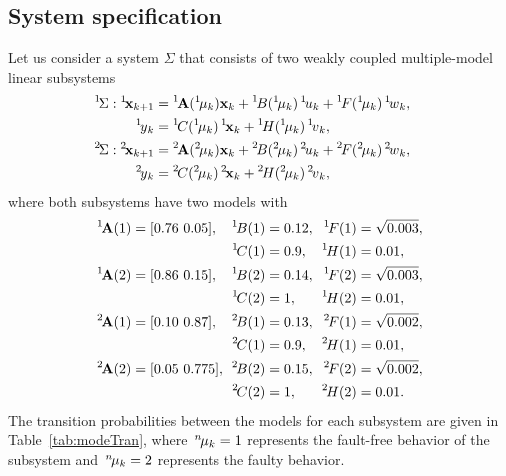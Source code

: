 \documentclass[conference,10pt]{IEEEtran}
\def\ist{\prescript{1\!}{}}
\def\iind{\prescript{2\!}{}}
\def\nth{\prescript{n\!}{}}
\begin{document}
\subsection{System specification}
\label{sec:ExampleSystemSpecification}
Let us consider a system $\Sigma$ that consists of two weakly
coupled multiple-model linear subsystems
\begin{subequations}
\begin{align*}
  \hspace{-1em}
  \ist{\Sigma}: \ist{\bfx}_{k+1} &= \ist{\bfA}(\ist{\mu}_{k}) \bfx_{k} +
  \ist{B}(\ist{\mu}_{k})\ist{u}_{k} +
  \ist{F}(\ist{\mu}_{k})\ist{w}_{k},\\
  \ist{y}_k&=\ist{C}(\ist{\mu}_{k})\ist{\bfx}_{k}+\ist{H}(\ist{\mu}_{k})\ist{v}_k,\\
  \hspace{-1em}
  \iind{\Sigma}: \iind{\bfx}_{k+1} &=  \iind{\bfA}(\iind{\mu}_{k}) \bfx_{k} +
  \iind{B}(\iind{\mu}_{k})\iind{u}_{k} +
  \iind{F}(\iind{\mu}_{k})\iind{w}_{k},\\
  \iind{y}_k&=\iind{C}(\iind{\mu}_{k})\iind{\bfx}_{k}+\iind{H}(\iind{\mu}_{k})\iind{v}_k,
\end{align*}
\end{subequations}
where both subsystems have two models with%
\begin{align*}
  \ist{\bfA}(1) & = [0.76\ 0.05], & \!\!\! \ist{B}(1) & = 0.12, & \!\! \ist{F}(1) & = \sqrt{0.003},\\
                &&\!\!\!\ist{C}(1) & = 0.9,  &\!\! \ist{H}(1) & = 0.01,\\
  \ist{\bfA}(2) & = [0.86\ 0.15], & \!\!\! \ist{B}(2) & = 0.14, & \!\! \ist{F}(2) & = \sqrt{0.003},\\
                &&\!\! \ist{C}(2) & = 1,    &\!\! \ist{H}(2) & = 0.01,\\
  \iind{\bfA}(1) & = [0.10\ 0.87], &\! \!\! \iind{B}(1) & = 0.13, & \!\! \iind{F}(1) & = \sqrt{0.002},\\
                 &&\!\!\!  \iind{C}(1) & = 0.9, &\!\! \iind{H}(1) & = 0.01,\\
  \iind{\bfA}(2) & = [0.05\ 0.775], &\!\! \!\! \iind{B}(2) & = 0.15, & \!\!\! \iind{F}(2) & = \sqrt{0.002},\\
                 &&\!\!\!  \iind{C}(2) & = 1,   & \!\! \iind{H}(2) & = 0.01.
\end{align*}
The transition probabilities between the models for each subsystem are given in Table~\ref{tab:modeTran}, where~$\nth{\mu}_k=1$ represents the fault-free behavior of the subsystem and~$\nth{\mu}_k=2$ represents the faulty behavior. 
\end{document}
